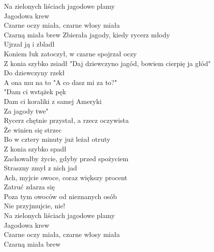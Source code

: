 
Na zielonych liściach jagodowe plamy \\
Jagodowa krew\tab{}\tab{}\\
Czarne oczy miała, czarne włosy miała \\
Czarną miała brew\tab{}
\hops
Zbierała jagody, kiedy rycerz młody \\
Ujrzał ją i zbladł \tab{}\\
Koniem łuk zatoczył, w czarne spojrzał oczy\\
Z konia szybko zsiadł \tab{}
\hops
"Daj dziewczyno jagód, bowiem cierpię ja głód" \\
Do dziewczyny rzekł \tab{}\tab{}\\
A ona mu na to "A co dasz mi za to?"\tab{}\\
"Dam ci wstążek pęk\tab{}\tab{}\\
\hops
Dam ci koraliki z samej Ameryki\\
Za jagody twe"\tab{}\tab{}\\
Rycerz chętnie przystał, a rzecz oczywista\\
Że winien się strzec\tab{}\\
\hops
Bo w cztery minuty już leżał otruty \\
Z konia szybko spadł \tab{}\\
Zachowałby życie, gdyby przed spożyciem\\
Straszny zmył z nich jad \tab{}\\
\hops
Ach, myjcie owoce, coraz większy procent \\
Zatruć zdarza się \tab{}\\
Poza tym owoców od nieznanych osób\\
Nie przyjmujcie, nie! \tab{}\\
\hops
Na zielonych liściach jagodowe plamy \\
Jagodowa krew \tab{}\\
Czarne oczy miała, czarne włosy miała\\
Czarną miała brew \tab{}